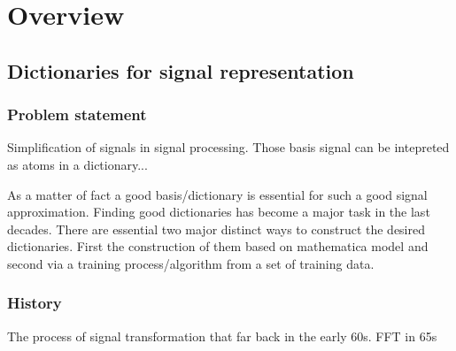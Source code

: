 \chapter{Overview}
\thispagestyle{empty}

\section{Dictionaries for signal representation}
\subsection{Problem statement}

Simplification of signals in signal processing.
Those basis signal can be intepreted as atoms in a dictionary...


As a matter of fact a good basis/dictionary is essential for such a good signal approximation. \cite{} 
Finding good dictionaries has become a major task in the last decades.
There are essential two major distinct ways to construct the desired dictionaries. First the construction of them based on mathematica model and second
via a training process/algorithm from a set of training data.




\subsection{History}

The process of signal transformation that far back in the early 60s.\cite{Rubinstein2010}
FFT in 65s

